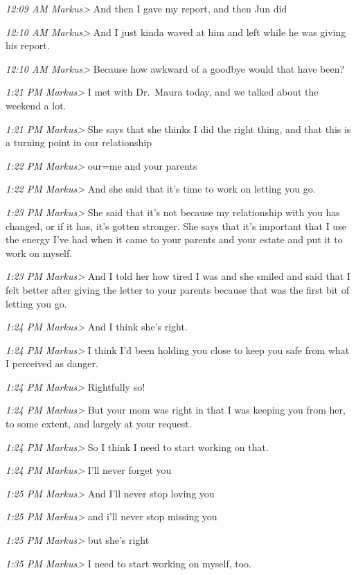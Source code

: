 {\emph{12:09 AM Markus\textgreater{}} And then I gave my report, and then
Jun did

\emph{12:10 AM Markus\textgreater{}} And I just kinda waved at him and
left while he was giving his report.

\emph{12:10 AM Markus\textgreater{}} Because how awkward of a goodbye
would that have been?

\emph{1:21 PM Markus\textgreater{}} I met with Dr.~Maura today, and we
talked about the weekend a lot.

\emph{1:21 PM Markus\textgreater{}} She says that she thinks I did the
right thing, and that this is a turning point in our relationship

\emph{1:22 PM Markus\textgreater{}} our=me and your parents

\emph{1:22 PM Markus\textgreater{}} And she said that it's time to work
on letting you go.

\emph{1:23 PM Markus\textgreater{}} She said that it's not because my
relationship with you has changed, or if it has, it's gotten stronger.
She says that it's important that I use the energy I've had when it came
to your parents and your estate and put it to work on myself.

\emph{1:23 PM Markus\textgreater{}} And I told her how tired I was and
she smiled and said that I felt better after giving the letter to your
parents because that was the first bit of letting you go.

\emph{1:24 PM Markus\textgreater{}} And I think she's right.

\emph{1:24 PM Markus\textgreater{}} I think I'd been holding you close
to keep you safe from what I perceived as danger.

\emph{1:24 PM Markus\textgreater{}} Rightfully so!

\emph{1:24 PM Markus\textgreater{}} But your mom was right in that I was
keeping you from her, to some extent, and largely at your request.

\emph{1:24 PM Markus\textgreater{}} So I think I need to start working
on that.

\emph{1:24 PM Markus\textgreater{}} I'll never forget you

\emph{1:25 PM Markus\textgreater{}} And I'll never stop loving you

\emph{1:25 PM Markus\textgreater{}} and i'll never stop missing you

\emph{1:25 PM Markus\textgreater{}} but she's right

\emph{1:35 PM Markus\textgreater{}} I need to start working on myself,
too.

}
